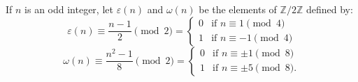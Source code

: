 If $n$ is an odd integer, let $\varepsilon(n)$ and $\omega(n)$ be the elements of $\mathbb{Z}/2\mathbb{Z}$ defined by:
$$\varepsilon(n) \equiv \frac{n-1}{2} \pmod{2} = \begin{cases} 0 & \text{if } n \equiv 1 \pmod{4} \\ 1 & \text{if } n \equiv -1 \pmod{4} \end{cases}$$
$$\omega(n) \equiv \frac{n^2-1}{8} \pmod{2} = \begin{cases} 0 & \text{if } n \equiv \pm 1 \pmod{8} \\ 1 & \text{if } n \equiv \pm 5 \pmod{8}. \end{cases}$$
